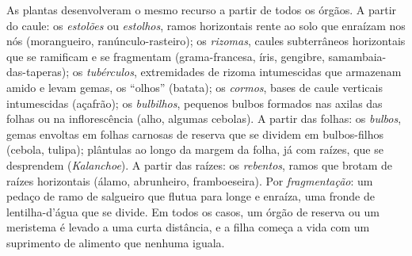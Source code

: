 \begin{proposition}\label{prop:b2:asexual-reproduction:organs}
As plantas desenvolveram o mesmo recurso a partir de todos os órgãos. A
partir do caule: os \emph{estolões} ou \emph{estolhos}, ramos
horizontais rente ao solo
que enraízam nos nós (morangueiro, ranúnculo-rasteiro); os
\emph{rizomas}, caules subterrâneos horizontais que se ramificam e se
fragmentam (grama-francesa, íris, gengibre, samambaia-das-taperas); os
\emph{tubérculos}, extremidades de rizoma intumescidas que armazenam
amido e levam gemas, os ``olhos'' (batata); os \emph{cormos}, bases de
caule verticais intumescidas (açafrão); os \emph{bulbilhos}, pequenos
bulbos formados nas axilas das folhas ou na inflorescência (alho,
algumas cebolas). A partir das folhas: os \emph{bulbos}, gemas envoltas
em folhas carnosas de reserva que se dividem em bulbos-filhos (cebola,
tulipa); plântulas ao longo da margem da folha, já com raízes, que se
desprendem (\emph{Kalanchoe}). A partir das raízes: os \emph{rebentos},
ramos que brotam de raízes horizontais (álamo, abrunheiro, framboeseira).
Por \emph{fragmentação}: um pedaço de ramo de salgueiro que flutua para
longe e enraíza, uma fronde de lentilha-d'água que se divide. Em todos
os casos, um órgão de reserva ou um meristema é levado a uma curta
distância, e a filha começa a vida com um suprimento de alimento que
nenhuma  iguala.
\end{proposition}

